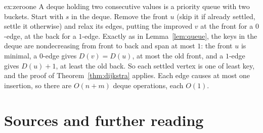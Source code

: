 \begin{solution}{ex:zeroone}
\idea A deque holding two consecutive values is a priority queue with two buckets.
\writeup Start with $s$ in the deque. Remove the front $u$ (skip it if already settled, settle it otherwise) and relax its edges, putting the improved $v$ at the front for a $0$-edge, at the back for a $1$-edge. Exactly as in Lemma~\ref{lem:queue}, the keys in the deque are nondecreasing
from front to back and span at most $1$: the front $u$ is minimal, a $0$-edge gives $D(v)=D(u)$, at most the old front, and a $1$-edge gives $D(u)+1$, at least the old back. So each settled vertex is one of least key, and the proof of Theorem~\ref{thm:dijkstra} applies.
Each edge causes at most one insertion, so there are $O(n+m)$ deque operations, each $O(1)$.
\end{solution}

\section*{Sources and further reading}


